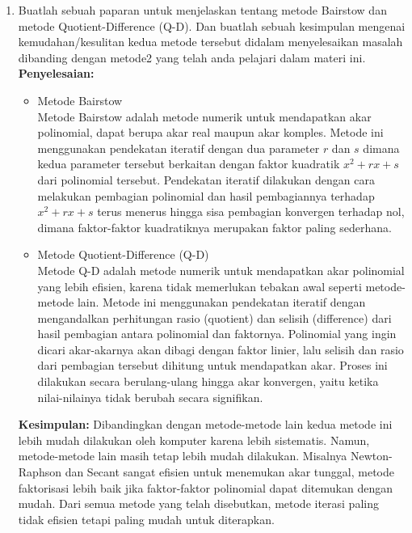 \documentclass{article}
\newcommand{\penyelesaian}{\textbf{Penyelesaian: }}
\begin{document}
\begin{enumerate}
    \item Buatlah sebuah paparan untuk menjelaskan tentang metode Bairstow dan metode Quotient-Difference (Q-D). 
    Dan buatlah sebuah kesimpulan mengenai kemudahan/kesulitan kedua metode tersebut didalam menyelesaikan masalah dibanding dengan metode2 yang telah anda pelajari dalam materi ini. \\
    \penyelesaian
    \begin{itemize}
        \item Metode Bairstow \\
        Metode Bairstow adalah metode numerik untuk mendapatkan akar polinomial, dapat berupa akar real maupun akar komples.
        Metode ini menggunakan pendekatan iteratif dengan dua parameter $r$ dan $s$ dimana kedua parameter tersebut berkaitan dengan faktor kuadratik $x^2 + rx + s$ dari polinomial tersebut.
        Pendekatan iteratif dilakukan dengan cara melakukan pembagian polinomial dan hasil pembagiannya terhadap $x^2 + rx + s$ terus menerus hingga sisa pembagian konvergen terhadap nol, dimana faktor-faktor kuadratiknya merupakan faktor paling sederhana.
        \item Metode Quotient-Difference (Q-D) \\
        Metode Q-D adalah metode numerik untuk mendapatkan akar polinomial yang lebih efisien, karena tidak memerlukan tebakan awal seperti metode-metode lain.
        Metode ini menggunakan pendekatan iteratif dengan mengandalkan perhitungan rasio (quotient) dan selisih (difference) dari hasil pembagian antara polinomial dan faktornya.
        Polinomial yang ingin dicari akar-akarnya akan dibagi dengan faktor linier, lalu selisih dan rasio dari pembagian tersebut dihitung untuk mendapatkan akar.
        Proses ini dilakukan secara berulang-ulang hingga akar konvergen, yaitu ketika nilai-nilainya tidak berubah secara signifikan.
    \end{itemize}

    \textbf{Kesimpulan: } Dibandingkan dengan metode-metode lain kedua metode ini lebih mudah dilakukan oleh komputer karena lebih sistematis.
    Namun, metode-metode lain masih tetap lebih mudah dilakukan. Misalnya Newton-Raphson dan Secant sangat efisien untuk menemukan akar tunggal, metode faktorisasi lebih baik jika faktor-faktor polinomial dapat ditemukan dengan mudah. Dari semua metode yang telah disebutkan, metode iterasi paling tidak efisien tetapi paling mudah untuk diterapkan.

\end{enumerate}
\end{document}
